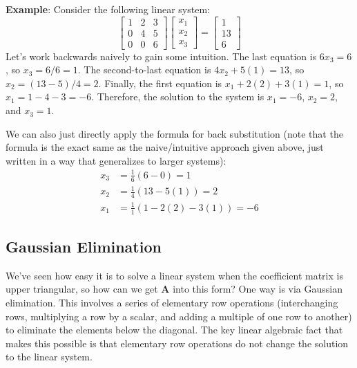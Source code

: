 \begin{exampleBox}
    \textbf{Example}: Consider the following linear system:
    \begin{equation*}
        \begin{bmatrix}
        1 & 2 & 3 \\
        0 & 4 & 5 \\
        0 & 0 & 6
        \end{bmatrix}
        \begin{bmatrix}
        x_1 \\ x_2 \\ x_3
        \end{bmatrix}
        =
        \begin{bmatrix}
        1 \\ 13 \\ 6
        \end{bmatrix}
    \end{equation*}
    Let's work backwards naively to gain some intuition. The last equation is $ 6x_3 = 6 $, so $ x_3 = 6/6 = 1 $. The second-to-last equation is $ 4x_2 + 5(1) = 13 $, so $ x_2 = (13 - 5)/4 = 2 $. Finally, the first equation is $ x_1 + 2(2) + 3(1) = 1 $, so $ x_1 = 1 - 4 - 3 = -6 $. Therefore, the solution to the system is $ x_1 = -6 $, $ x_2 = 2 $, and $ x_3 = 1 $.

    We can also just directly apply the formula for back substitution (note that the formula is the exact same as the naive/intuitive approach given above, just written in a way that generalizes to larger systems):
    \begin{align*}
        x_3 & = \frac{1}{6} \left( 6 - 0 \right) = 1 \\
        x_2 & = \frac{1}{4} \left( 13 - 5(1) \right) = 2 \\
        x_1 & = \frac{1}{1} \left( 1 - 2(2) - 3(1) \right) = -6
    \end{align*}
\end{exampleBox}

\subsection{Gaussian Elimination}
We've seen how easy it is to solve a linear system when the coefficient matrix is upper triangular, so how can we get $\mathbf{A}$ into this form? One way is via Gaussian elimination. This involves a series of elementary row operations (interchanging rows, multiplying a row by a scalar, and adding a multiple of one row to another) to eliminate the elements below the diagonal. The key linear algebraic fact that makes this possible is that elementary row operations do not change the solution to the linear system.

